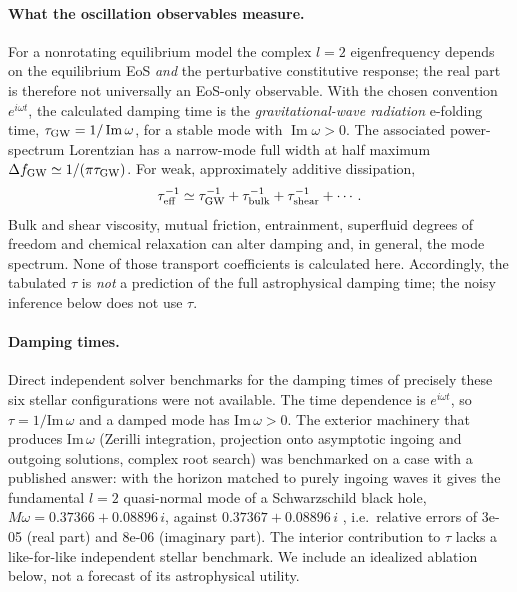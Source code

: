 \documentclass[11pt,a4paper]{article}
\begin{document}
\paragraph{What the oscillation observables measure.}
For a nonrotating equilibrium model the complex $l=2$ eigenfrequency depends on the equilibrium EoS \emph{and} the perturbative constitutive response; the real part is therefore not universally an EoS-only observable. With the chosen convention $e^{i\omega t}$, the calculated damping time is the \emph{gravitational-wave radiation} e-folding time, $\tau_{\rm GW}=1/\operatorname{Im}\omega$, for a stable mode with $\operatorname{Im}\omega>0$. The associated power-spectrum Lorentzian has a narrow-mode full width at half maximum $\Delta f_{\rm GW}\simeq 1/(\pi\tau_{\rm GW})$. For weak, approximately additive dissipation,
\begin{equation}
  \tau_{\rm eff}^{-1}\simeq \tau_{\rm GW}^{-1}+
  \tau_{\rm bulk}^{-1}+\tau_{\rm shear}^{-1}+\cdots .
\end{equation}
Bulk and shear viscosity, mutual friction, entrainment, superfluid degrees of freedom and chemical relaxation can alter damping and, in general, the mode spectrum. None of those transport coefficients is calculated here. Accordingly, the tabulated $\tau$ is \emph{not} a prediction of the full astrophysical damping time; the noisy inference below does not use $\tau$.
\paragraph{Damping times.} Direct independent solver benchmarks for the damping times of precisely these six stellar configurations were not available. The time dependence is $e^{i\omega t}$, so $\tau=1/\mathrm{Im}\,\omega$ and a damped mode has $\mathrm{Im}\,\omega>0$. The exterior machinery that produces $\mathrm{Im}\,\omega$ (Zerilli integration, projection onto asymptotic ingoing and outgoing solutions, complex root search) was benchmarked on a case with a published answer: with the horizon matched to purely ingoing waves it gives the fundamental $l=2$ quasi-normal mode of a Schwarzschild black hole, $M\omega=0.37366+0.08896\,i$, against $0.37367+0.08896\,i$ \citep{Leaver85}, i.e.\ relative errors of 3e-05 (real part) and 8e-06 (imaginary part). The interior contribution to $\tau$ lacks a like-for-like independent stellar benchmark. We include an idealized ablation below, not a forecast of its astrophysical utility.
\end{document}
